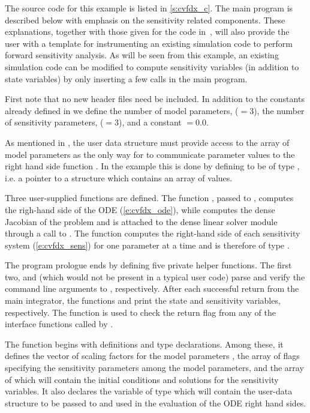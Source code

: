 The source code for this example is listed in \A\ref{s:cvfdx_c}. The main program is described 
below with emphasis on the sensitivity related components. 
These explanations, together with those given for the code 
in~\cite{cvode2.2.0_ex}, will also provide the user with a template for instrumenting 
an existing simulation code to perform forward sensitivity analysis.
As will be seen from this example, an existing simulation code can be modified to compute 
sensitivity variables (in addition to state variables) by only inserting a few {\cvodes} 
calls in the main program. 

First note that no new header files need be included. In addition to the constants already
defined in  we define the number of model parameters,  ($=3$),
the number of sensitivity parameters,  ($=3$), and a constant $=0.0$. 

As mentioned in , the user data
structure  must provide access to the array of model parameters 
as the only way for {\cvodes} to communicate parameter values to the right hand side 
function . In the  example this is done by defining  to be 
of type , i.e. a pointer to a structure which contains an array of 
  values.

Three user-supplied functions are defined. The function , passed to
, computes the righ-hand side of the ODE (\ref{e:cvfdx_ode}), while
 computes the dense Jacobian of the problem and is attached to the
dense linear solver module {\cvdense} through a call to .
The function  computes the right-hand side of each sensitivity system
(\ref{e:cvfdx_sens}) for one parameter at a time and is therefore of type
.

The program prologue ends by defining five private helper functions. 
The first two,  and  (which would not be present in 
a typical user code) parse and verify the command line arguments to , respectively.
After each successful return from the main {\cvodes} integrator, the functions 
 and  print the state and sensitivity variables,
respectively. 
The function  is used to check the return flag from any of the
{\cvodes} interface functions called by .

The  function begins with definitions and type declarations. 
Among these, it defines the vector  of  scaling factors for
the model parameters , the array  of  flags specifying
the sensitivity parameters among the model parameters, and the array  of 
 which will contain the initial conditions and solutions for the sensitivity
variables. It also declares the variable  of type  
which will contain the user-data structure to be passed to {\cvodes} and used in the 
evaluation of the ODE right hand sides.

